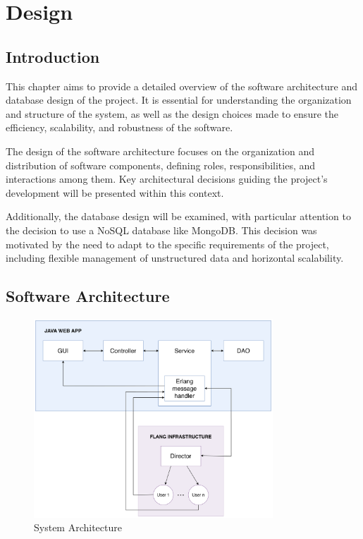 \chapter{Design}

\section{Introduction}
This chapter aims to provide a detailed overview of the software architecture and database design of the project. It is essential for understanding the organization and structure of the system, as well as the design choices made to ensure the efficiency, scalability, and robustness of the software.

The design of the software architecture focuses on the organization and distribution of software components, defining roles, responsibilities, and interactions among them. Key architectural decisions guiding the project's development will be presented within this context.

Additionally, the database design will be examined, with particular attention to the decision to use a NoSQL database like MongoDB. This decision was motivated by the need to adapt to the specific requirements of the project, including flexible management of unstructured data and horizontal scalability.


\section{Software Architecture}

\begin{figure}[ht!]
    \centering
    \includegraphics[width=0.8\textwidth]{images/2_analisys/FL_proj_Arch_FINAL.png}
    \caption{System Architecture}
    \label{fig:system_architecture}
\end{figure}


